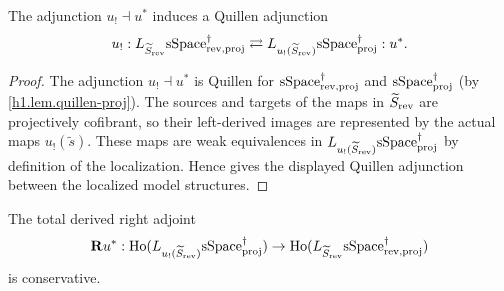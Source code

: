 \documentclass[a4paper,dvipdfmx,11pt]{amsart}
\begin{document}
\begin{lemma}\label{h1.thm.adjunction}
  The adjunction $u_{!}\dashv u^{*}$ induces a Quillen adjunction
  \begin{align}
    u_{!}:
    L_{\widetilde S_{\mathrm{rev}}}\mathrm{sSpace}^{\dag}_{\mathrm{rev},\mathrm{proj}}
    \rightleftarrows
    L_{u_{!}(\widetilde S_{\mathrm{rev}})}\mathrm{sSpace}^{\dag}_{\mathrm{proj}}
    :u^{*}.
  \end{align}
\end{lemma}

\begin{proof}
  The adjunction $u_{!}\dashv u^{*}$ is Quillen for $\mathrm{sSpace}^{\dag}_{\mathrm{rev},\mathrm{proj}}$ and $\mathrm{sSpace}^{\dag}_{\mathrm{proj}}$ (by \cref{h1.lem.quillen-proj}).
  The sources and targets of the maps in $\widetilde S_{\mathrm{rev}}$ are projectively cofibrant, so their left-derived images are represented by the actual maps $u_{!}(\widetilde s)$.
  These maps are weak equivalences in $L_{u_{!}(\widetilde S_{\mathrm{rev}})}\mathrm{sSpace}^{\dag}_{\mathrm{proj}}$ by definition of the localization.
  Hence \cite[Theorem~3.3.20 (1)(a)]{Hir02} gives the displayed Quillen adjunction between the localized model structures.
\end{proof}

\begin{proposition}\label{h1.thm.conservative}
  The total derived right adjoint
  \begin{align}
    \mathbf{R} u^{*}:
    \mathrm{Ho}(L_{u_{!}(\widetilde S_{\mathrm{rev}})}\mathrm{sSpace}^{\dag}_{\mathrm{proj}})
    \to
    \mathrm{Ho}(L_{\widetilde S_{\mathrm{rev}}}\mathrm{sSpace}^{\dag}_{\mathrm{rev},\mathrm{proj}})
  \end{align}
  is conservative.
\end{proposition}
\end{document}
